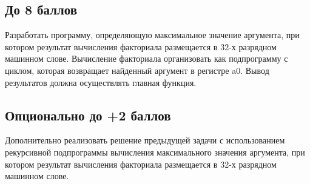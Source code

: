 \subsection{До 8 баллов}
Разработать программу, определяющую максимальное значение аргумента, при котором результат вычисления факториала размещается в 32-х разрядном машинном слове. Вычисление факториала организовать как подпрограмму с циклом, которая возвращает найденный аргумент в регистре a0. Вывод результатов должна осуществлять главная функция.

\subsection{Опционально до +2 баллов}
Дополнительно реализовать решение предыдущей задачи с использованием рекурсивной подпрограммы вычисления максимального значения аргумента, при котором результат вычисления факториала размещается в 32-х разрядном машинном слове.


